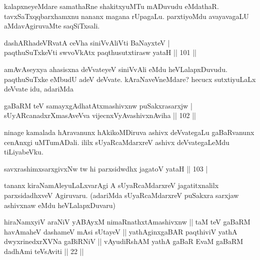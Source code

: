 \begin{artha}
kalapxneyeMdare samathaRne shakitxyuMTu mADuvudu eMdathaR. 
tavxSaTxqqbarxhamxnu nananx magana rUpagaLu. parxtiyoMdu avayavagaLU 
aMdavAgiruvaMte saqSiTxsali.
\end{artha}


\begin{shl}
dashARhadeVRvatA ceVha siniVvAliVti BaNayxteV | \\
paqthuSuTxkeVti swvoVkAtx paqthusutxtirasw yataH \hfill|| 101 || 
\end{shl}

\begin{artha}
amAvAseyxya ahasisxna deVvateyeV siniVvAli eMdu heVLalapxDuvudu. 
paqthuSuTxke eMbudU adeV deVvate. kAraNaveVneMdare? hecucx 
sutxtiyuLaLx deVvate idu, adariMda
\end{artha}

\begin{shl}
gaBaRM teV samayxgAdhatAtxmashivxnw puSakxrasarxjw | \\
sUyARcanadxrXmasAveVva vijecnxVyAvashivxnAviha \hfill|| 102 || 
\end{shl}

\begin{artha}
ninage kamalada hAravanunx hAkikoMDiruva ashivx deVvategaLu 
gaBaRvanunx cenAnxgi uMTumADali. ililx sUyaRcaMdarxreV ashivx 
deVvategaLeMdu tiLiyabeVku.
\end{artha}


\begin{shl}
savxrashimxsarxgivxNw tw hi parxsidwdhx jagatoV yataH \hfill|| 103 | \\
\end{shl}

\begin{artha}
tananx kiraNamAleyuLaLxvarAgi A sUyaRcaMdarxreV jagatitxnalilx 
parxsidadhxveV Agiruvaru. (adariMda sUyaRcaMdarxreV puSakxra sarxjaw 
ashivxnaw eMdu heVLalapxDuvaru)
\end{artha}


\begin{shl}
hiraNamxyiV araNiV yABAyxM nimaRnathxtAmashivxnw || taM teV gaBaRM havAmaheV dashameV mAsi sUtayeV || yathAginxgaBAR paqthiviV yathA dwyxrinedxrXVNa gaBiRNiV || vAyudiRshAM yathA gaBaR EvaM gaBaRM dadhAmi teV\s sAviti || 22 ||
\end{shl}
 
